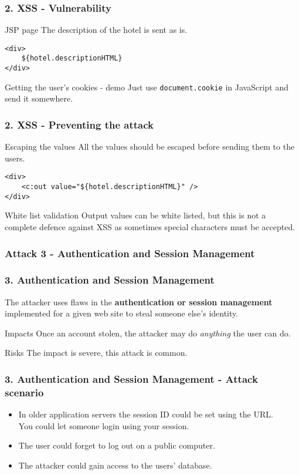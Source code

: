 \begin{frame}[fragile]
\frametitle{2. XSS - Vulnerability}
\begin{exampleblock}{JSP page}
The description of the hotel is sent as is.
\begin{lstlisting}
<div>
	${hotel.descriptionHTML}
</div>
\end{lstlisting}
\end{exampleblock}
\pause
\begin{exampleblock}{Getting the user's cookies - demo}
Just use \lstinline!document.cookie! in JavaScript and send it somewhere.
\end{exampleblock}
\end{frame}

\begin{frame}[fragile]
\frametitle{2. XSS - Preventing the attack}
\begin{block}{Escaping the values}
All the values should be escaped before sending them to the users.
\begin{lstlisting}
<div>
	<c:out value="${hotel.descriptionHTML}" />
</div>
\end{lstlisting}
\end{block}
\begin{block}{White list validation}
Output values can be white listed, but this is not a complete defence against
XSS as sometimes special characters must be accepted.
\end{block}
\end{frame}

\subsubsection{Attack 3 - Authentication and Session Management}

\begin{frame}
\frametitle{3. Authentication and Session Management}
The attacker uses flaws in the \textbf{authentication or session management}
implemented for a given web site to steal someone else's identity.
\begin{block}{Impacts}
Once an account stolen, the attacker may do \emph{anything} the user
can do.
\end{block}
\begin{block}{Risks}
The impact is \alert{severe}, this attack is common.
\end{block}
\end{frame}

\begin{frame}
\frametitle{3. Authentication and Session Management - Attack scenario}
\begin{itemize}
\item In older application servers the session ID could be set using the URL.
	\\ You could let someone login using your session.
\item The user could forget to log out on a public computer.
\item The attacker could gain access to the users' database.
\end{itemize}
\end{frame}

